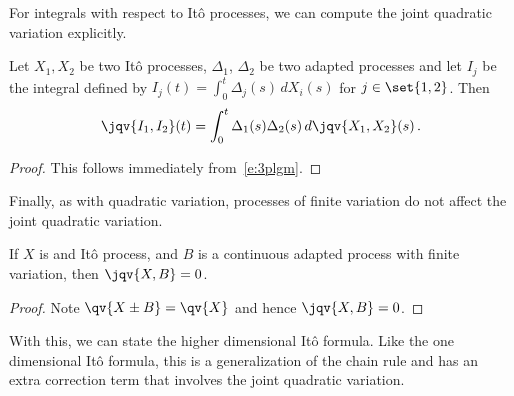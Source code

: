 For integrals with respect to It\^o processes, we can compute the joint quadratic variation explicitly.
\begin{proposition}
  Let $X_1, X_2$ be two It\^o processes, $\Delta_1$, $\Delta_2$ be two adapted processes and let $I_j$ be the integral defined by $I_j(t) = \int_0^t \Delta_j(s) \, d X_i(s)$ for $j \in \set{1, 2}$.
  Then
  \begin{equation*}
    \jqv{I_1, I_2}(t) = \int_0^t \Delta_1(s) \Delta_2(s) \, d\jqv{X_1, X_2}(s) \,.
  \end{equation*}
\end{proposition}
\begin{proof}
  This follows immediately from~\eqref{e:3plgm}.
\end{proof}

Finally, as with quadratic variation, processes of finite variation do not affect the joint quadratic variation.
\begin{proposition}
  If $X$ is and It\^o process, and $B$ is a continuous adapted process with finite variation, then $\jqv{X,B} = 0$.
\end{proposition}
\begin{proof}
  Note $\qv{X\pm B} = \qv{X}$ and hence $\jqv{X, B} = 0$.
\end{proof}

With this, we can state the higher dimensional It\^o formula.
Like the one dimensional It\^o formula, this is a generalization of the chain rule and has an extra correction term that involves the joint quadratic variation.

